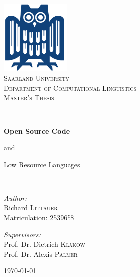 \documentclass[12pt,a4paper]{article}
\author{Richard Littauer}
\begin{document}
\hypersetup{pageanchor=false}

\begin{titlepage}
	\begin{center}

		\includegraphics[width=0.25\textwidth]{img/eule.png}~\\[1cm]

		\textsc{\LARGE Saarland  University}\\[0.4cm]
		\textsc{\Large Department of Computational Linguistics}\\[1.5cm]

		\textsc{\LARGE Master's Thesis}\vspace{0.5cm}

		\HRule \\[0.55cm]

		{ \huge \bfseries Open Source Code

			 and\vspace{0.2cm}

			 Low Resource Languages}\vspace{0.5cm}

		\HRule \\[1.5cm]

		\begin{minipage}{0.45\textwidth}
			\begin{flushleft} \large
				\emph{Author:}\\
				Richard \textsc{Littauer}\\
				Matriculation: 2539658
			\end{flushleft}
		\end{minipage}
		\begin{minipage}{0.45\textwidth}
			\begin{flushright} \large
				\emph{Supervisors:} \\
				Prof. Dr. Dietrich \textsc{Klakow}\\
				Prof. Dr. Alexis \textsc{Palmer}\\
			\end{flushright}
		\end{minipage}

		\vfill

		{\large \today}

	\end{center}
\end{titlepage}
\newpage
\end{document}
